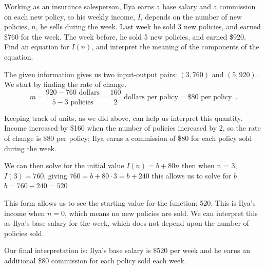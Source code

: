 

\begin{example}
Working as an insurance salesperson, Ilya earns a base salary and a commission on each new policy, so his weekly income, $I$, depends on the number of new policies, $n$, he sells during the week. Last week he sold 3 new policies, and earned \$760 for the week. The week before, he sold 5 new policies, and earned \$920. Find an equation for $I(n)$, and interpret the meaning of the components of the equation.

\begin{solution} The given information gives us two input-output pairs: $(3,760)$ and $(5,920)$. We start by finding the rate of change.
$$m = \frac{920-760 \mbox{ dollars}}{5-3\mbox{ policies}}=\frac{160}{2} \mbox{ dollars per policy} = \$80 \mbox{ per policy} \enspace .$$

Keeping track of units, as we did above, can help us interpret this quantity. Income increased by \$160 when the number of policies increased by 2, so the rate of change is \$80 per policy; Ilya earns a commission of \$80 for each policy sold during the week.

We can then solve for the initial value
$I(n) = b + 80n$		then when n = 3, $I(3) = 760$, giving
$760 = b+80\cdot 3 = b + 240$		this allows us to solve for $b$
$b = 760 - 240 = 520$

This form allows us to see the starting value for the function: 520. This is Ilya's income when $n = 0$, which means no new policies are sold. We can interpret this as Ilya's base salary for the week, which does not depend upon the number of policies sold.

Our final interpretation is: Ilya's base salary is \$520 per week and he earns an additional \$80 commission for each policy sold each week.
\end{solution}\end{example}


